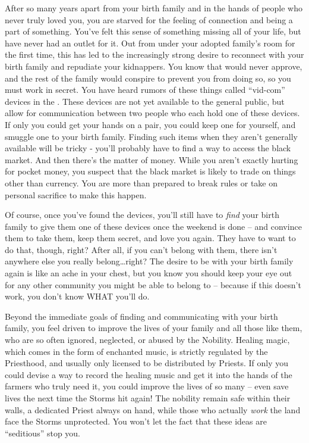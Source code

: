 \documentclass[char]{GL2020}
\begin{document}
After so many years apart from your birth family and in the hands of people who never truly loved you, you are starved for the feeling of connection and being a part of something. You’ve felt this sense of something missing all of your life, but have never had an outlet for it.  Out from under your adopted family’s room for the first time, this has led to the increasingly strong desire to reconnect with your birth family and repudiate your kidnappers. You know that \cAdoptedParentOne{} would never approve, and the rest of the family would conspire to prevent you from doing so, so you must work in secret. You have heard rumors of these things called ``vid-com'' devices in the \pTech{}. These devices are not yet available to the general public, but allow for communication between two people who each hold one of these devices. If only you could get your hands on a pair, you could keep one for yourself, and smuggle one to your birth family. Finding such items when they aren't generally available will be tricky - you'll probably have to find a way to access the black market. And then there's the matter of money. While you aren't exactly hurting for pocket money, you suspect that the black market is likely to trade on things other than \pFarm{} currency. You are more than prepared to break rules or take on personal sacrifice to make this happen.

Of course, once you’ve found the devices, you'll still have to \emph{find} your birth family to give them one of these devices once the weekend is done -- and convince them to take them, keep them secret, and love you again. They have to want to do that, though, right? After all, if you can’t belong with them, there isn’t anywhere else you really belong\ldots right? The desire to be with your birth family again is like an ache in your chest, but you know you should keep your eye out for any other community you might be able to belong to -- because if this doesn’t work, you don’t know WHAT you’ll do.

Beyond the immediate goals of finding and communicating with your birth family, you feel driven to improve the lives of your family and all those like them, who are so often ignored, neglected, or abused by the Nobility. Healing magic, which comes in the form of enchanted music, is strictly regulated by the Priesthood, and usually only licensed to be distributed by Priests.  If only you could devise a way to record the healing music and get it into the hands of the farmers who truly need it, you could improve the lives of so many -- even save lives the next time the Storms hit \pFarm{} again!  The nobility remain safe within their walls, a dedicated Priest always on hand, while those who actually \emph{work} the land face the Storms unprotected. You won't let the fact that these ideas are ``seditious''  stop you.
\end{document}
